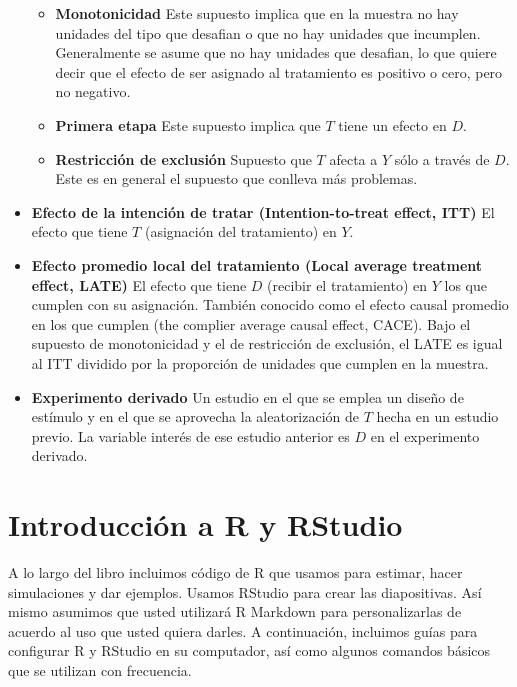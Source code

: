 \documentclass[12pt,spanish,]{book}
\providecommand{\tightlist}{%
  \setlength{\itemsep}{0pt}\setlength{\parskip}{0pt}}
\begin{document}
\begin{itemize}
  \begin{itemize}
  \tightlist
  \item
    \textbf{Monotonicidad} Este supuesto implica que en la muestra no hay unidades del tipo que desafian o que no hay unidades que incumplen. Generalmente se asume que no hay unidades que desafian, lo que quiere decir que el efecto de ser asignado al tratamiento es positivo o cero, pero no negativo.
  \item
    \textbf{Primera etapa} Este supuesto implica que \(T\) tiene un efecto en \(D\).
  \item
    \textbf{Restricción de exclusión} Supuesto que \(T\) afecta a \(Y\) sólo a través de \(D\). Este es en general el supuesto que conlleva más problemas.
  \end{itemize}
\item
  \textbf{Efecto de la intención de tratar (Intention-to-treat effect, ITT)} El efecto que tiene \(T\) (asignación del tratamiento) en \(Y\).
\item
  \textbf{Efecto promedio local del tratamiento (Local average treatment effect, LATE)} El efecto que tiene \(D\) (recibir el tratamiento) en \(Y\) los que cumplen con su asignación. También conocido como el efecto causal promedio en los que cumplen (the complier average causal
  effect, CACE). Bajo el supuesto de monotonicidad y el de restricción de exclusión, el LATE es igual al ITT dividido por la proporción de unidades que cumplen en la muestra.
\item
  \textbf{Experimento derivado} Un estudio en el que se emplea un diseño de estímulo y en el que se aprovecha la aleatorización de \(T\) hecha en un estudio previo. La variable interés de ese estudio anterior es \(D\) en el experimento derivado.
\end{itemize}

\hypertarget{introducciuxf3n-a-r-y-rstudio}{%
\chapter{Introducción a R y RStudio}\label{introducciuxf3n-a-r-y-rstudio}}

A lo largo del libro incluimos código de R que usamos para estimar, hacer simulaciones y dar ejemplos. Usamos RStudio para crear las diapositivas. Así mismo asumimos que usted utilizará R Markdown para personalizarlas de acuerdo al uso que usted quiera darles. A continuación, incluimos guías para configurar R y RStudio en su computador, así como algunos comandos básicos que se utilizan con frecuencia.
\end{document}
